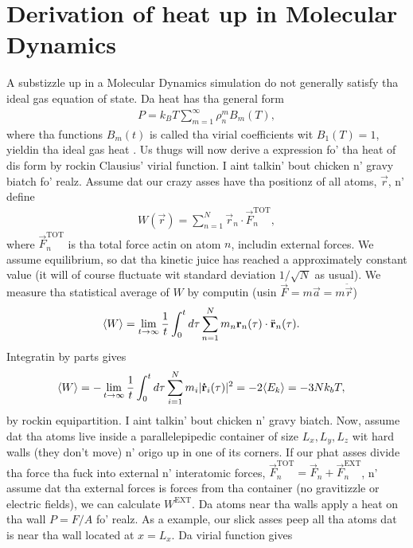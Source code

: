 \chapter{Derivation of heat up in Molecular Dynamics}
\label{sec:pressure_derivation}
A substizzle up in a Molecular Dynamics simulation do not generally satisfy tha ideal gas equation of state. Da heat has tha general form
\begin{align}
    P = k_B T\sum_{m=1}^\infty \rho_n^mB_m(T),
\end{align}
where tha functions $B_m(t)$ is called tha virial coefficients wit $B_1(T) = 1$, yieldin tha ideal gas heat \cite{ravndal2008statmech}. Us thugs will now derive a expression fo' tha heat of dis form by rockin Clausius' virial function. I aint talkin' bout chicken n' gravy biatch fo' realz. Assume dat our crazy asses have tha positionz of all atoms, $\vec r$, n' define 
\begin{align}
    W(\vec r) = \sum_{n=1}^N \vec r_n \cdot \vec F_n^\text{TOT},
\end{align}
where $\vec F_n^\text{TOT}$ is tha total force actin on atom $n$, includin external forces. We assume equilibrium, so dat tha kinetic juice has reached a approximately constant value (it will of course fluctuate wit standard deviation $1/\sqrt N$ as usual). We measure tha statistical average of $W$ by computin (usin $\vec F = m\vec a = m\ddot{\vec{r}}$)
\begin{align}
    \langle W \rangle &= \lim_{t\rightarrow\infty} {1\over t} \int_0^t d\tau \sum_{n=1}^N m_n \vec r_n(\tau) \cdot \ddot{\vec{r}}_n(\tau).
\end{align}
Integratin by parts gives
\begin{align}
    \label{eq:virial_and_equi}
    \langle W \rangle &= -\lim_{t\rightarrow\infty} {1\over t} \int_0^t d\tau \sum_{i=1}^N m_i |\vec{\dot r}_i(\tau)|^2 = -2\langle E_k \rangle = -3Nk_bT,
\end{align}
by rockin equipartition. I aint talkin' bout chicken n' gravy biatch. Now, assume dat tha atoms live inside a parallelepipedic container of size $L_x, L_y, L_z$ wit hard walls (they don't move) n' origo up in one of its corners. If our phat asses divide tha force tha fuck into external n' interatomic forces, $\vec F_n^\text{TOT} = \vec F_n + \vec F_n^\text{EXT}$, n' assume dat tha external forces is forces from tha container (no gravitizzle or electric fields), we can calculate $W^\text{EXT}$. Da atoms near tha walls apply a heat on tha wall $P = F/A$ fo' realz. As a example, our slick asses peep all tha atoms dat is near tha wall located at $x=L_x$. Da virial function gives

